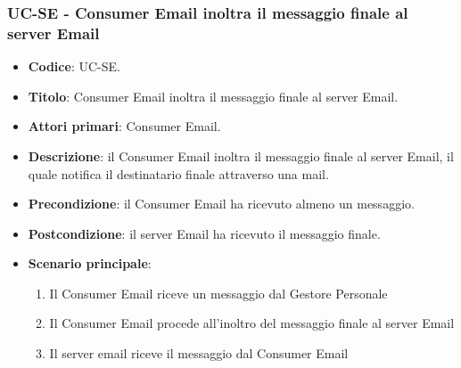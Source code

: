\subsubsection{UC\theuccount-SE - Consumer Email inoltra il messaggio finale al server Email}
	\begin{itemize}
		\item \textbf{Codice}: UC\theuccount-SE.
		\item \textbf{Titolo}: Consumer Email inoltra il messaggio finale al server Email.
		\item \textbf{Attori primari}: Consumer Email.
		\item \textbf{Descrizione}: il Consumer Email inoltra il messaggio finale al server Email, il quale notifica il destinatario finale attraverso una mail.
		\item \textbf{Precondizione}: il Consumer Email ha ricevuto almeno un messaggio.
		\item \textbf{Postcondizione}: il server Email ha ricevuto il messaggio finale.
		\item \textbf{Scenario principale}: 
		\begin{enumerate}
			\item Il Consumer Email riceve un messaggio dal Gestore Personale
			\item Il Consumer Email procede all'inoltro del messaggio finale al server Email
            \item Il server email riceve il messaggio dal Consumer Email
		\end{enumerate}
		
	\end{itemize}